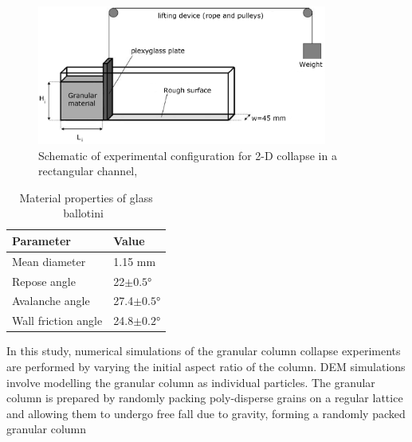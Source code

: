 \begin{figure}[tbhp]
\centering
\includegraphics[width=0.85\textwidth]{experiment_setup}
\caption{Schematic of experimental configuration for 2-D collapse in a 
rectangular channel,~\citep{Lajeunesse2004}}
\label{fig:exp}
\end{figure}

\begin{table}[tbhp]
\caption{Material properties of glass ballotini~\citep{Lajeunesse2004}}
\label{table:mat_prop}
\centering
\begin{tabular}{ll}
\toprule
\textbf{Parameter} & \textbf{Value} \\ \midrule
Mean diameter & 1.15 \si{\mm} \\
Repose angle & 22$\pm 0.5$\si{\degree} \\
Avalanche angle & 27.4$\pm 0.5$\si{\degree} \\
Wall friction angle & 24.8$\pm 0.2$\si{\degree}\\
\bottomrule
\end{tabular}
\end{table}

In this study, numerical simulations of the granular column collapse 
experiments are performed by varying the initial aspect ratio of the column. 
DEM simulations involve modelling the granular column as 
individual particles. The granular column is prepared by randomly packing 
poly-disperse grains on a regular lattice and allowing them to undergo free 
fall due to gravity, forming a randomly packed granular column 


